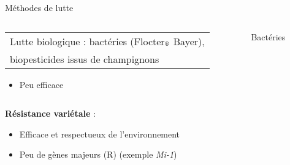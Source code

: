 \begin{frame}[fragile]{Méthodes de lutte}
\begin{columns}
\begin{column}{.3\textwidth}
 \end{column}
\end{columns}
\pause
\begin{columns}
 \begin{column}{.8\textwidth}
\hspace{5mm}
{\normalsize \begin{tabular}[t]{@{}l@{}} Lutte biologique : bactéries (Flocter$_{\mbox{\scriptsize{\textregistered}}}$ Bayer), \\
biopesticides issus de champignons \end{tabular}}
 {\small           \begin{itemize}[leftmargin=1.22cm]
\item Peu efficace

            \end{itemize}
} 
 \end{column}

 \begin{column}{.3\textwidth}
\hspace{6mm} {\small Bactéries}
 \end{column}
\end{columns}

\pause
\begin{columns}
 \begin{column}{.8\textwidth}
 \hspace{5mm} 
{\normalsize \alert{\bf Résistance variétale} :}
{ \small
            \begin{itemize}[leftmargin=1.22cm]
\item  Efficace et respectueux de l'environnement
\item Peu de gènes majeurs (R) (exemple 
 \textit{Mi-1})
            \end{itemize}
 }\end{column}


\end{columns}
\end{frame}

